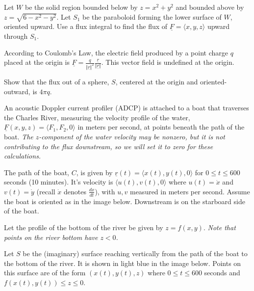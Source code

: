 \documentclass[12pt,letterpaper,noanswers]{exam}
\newcommand{\mb}[1]{\underline{#1}}
\begin{document}
\begin{questions}
\question
Let $W$ be the solid region bounded below by $z = x^2+y^2$ and bounded above by $z = \sqrt{6-x^2-y^2}$.  Let $S_1$ be the paraboloid forming the lower surface of $W$, oriented upward.  %
Use a flux integral to find the flux of $\underline F =\langle x, y, z\rangle$ upward through $S_1$.


\question According to Coulomb's Law, the electric field produced by a point charge $q$ placed at the origin is $\displaystyle \underline F = \frac{q}{\Vert \underline r\Vert^2}\frac{\underline r}{\Vert \underline r\Vert}$.  This vector field is undefined at the origin.

 Show that the flux out of a sphere, $S$, centered at the origin and oriented-outward, is $4\pi q$.
 
 
 

\item An acoustic Doppler current profiler (ADCP) is attached to a boat that traverses the Charles River, measuring the velocity profile of the water, $\mb F(x,y,z) = \langle F_1, F_2, 0\rangle$ in meters per second, at points beneath the path of the boat.  \emph{The $z$-component of the water velocity may be nonzero, but it is not contributing to the flux downstream, so we will set it to zero for these calculations.} 

The path of the boat, $C$, is given by $\mb r(t) = \langle x(t), y(t), 0\rangle$ for $0\leq t \leq 600$ seconds (10 minutes).  It's velocity is $\langle u(t), v(t), 0 \rangle$ where $u(t) = \dot x$ and $v(t) = \dot y$ (recall $\dot x$ denotes $\frac{dx}{dt}$), with $u,v$ measured in meters per second.  Assume the boat is oriented as in the image below.  Downstream is on the starboard side of the boat.

Let the profile of the bottom of the river be given by $z = f(x,y)$.  \emph{Note that points on the river bottom have $z < 0$.}

Let $S$ be the (imaginary) surface reaching vertically from the path of the boat to the bottom of the river.  It is shown in light blue in the image below.  Points on this surface are of the form $(x(t), y(t), z)$ where $0\leq t\leq 600$ seconds and $f(x(t),y(t)) \leq z \leq 0$.  


\end{questions}
\end{document}
